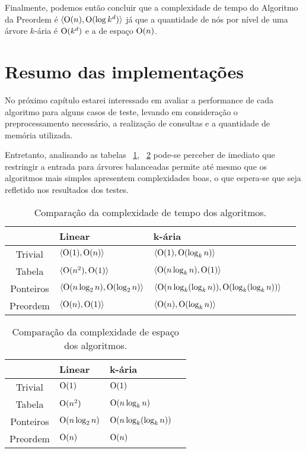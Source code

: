 Finalmente, podemos então concluir que a complexidade de tempo do Algoritmo da Preordem é
$\langle \mathrm{O}(n), \mathrm{O}(\log k^d)\rangle$ já que a quantidade de nós por nível de uma
árvore $k$-ária é $\mathrm{O}(k^d)$ e a de espaço $\mathrm{O}(n)$.

\section{Resumo das implementações}
No próximo capítulo estarei interessado em avaliar a performance de cada algoritmo
para alguns casos de teste, levando em consideração o preprocessamento necessário,
a realização de consultas e a quantidade de memória utilizada.

Entretanto, analisando as tabelas ~\ref{tab:complexidadetempo},
~\ref{tab:complexidadeespaco} pode-se perceber de imediato que restringir a entrada
para árvores balanceadas permite até mesmo que os algoritmos mais simples apresentem
complexidades boas, o que espera-se que seja refletido nos resultados dos testes.

\begin{table}[]
  \begin{tabular}{|c|l|l|l|}
    \hline
    & Linear                                       & k-ária                                       \\ \hline
  Trivial   & $\langle \mathrm{O}(1), \mathrm{O}(n) \rangle$                 & $\langle \mathrm{O}(1), \mathrm{O}(\log_k n) \rangle$          \\ \hline
  Tabela    & $\langle \mathrm{O}(n^2), \mathrm{O}(1) \rangle$               & $\langle \mathrm{O}(n \log_k n), \mathrm{O}(1) \rangle$        \\ \hline
  Ponteiros & $\langle \mathrm{O}(n \log_2 n), \mathrm{O}(\log_2 n) \rangle$ & $\langle \mathrm{O}(n \log_k (\log_k n)), \mathrm{O}(\log_k (\log_k n)) \rangle$ \\ \hline
  Preordem  & $\langle \mathrm{O}(n), \mathrm{O}(1) \rangle$                 & $\langle \mathrm{O}(n), \mathrm{O}(\log_k n) \rangle$          \\ \hline
  \end{tabular}
  \caption{Comparação da complexidade de tempo dos algoritmos.\label{tab:complexidadetempo}}
  \end{table}

  \begin{table}[]
    \begin{tabular}{|c|l|l|l|}
    \hline
              & Linear              & k-ária              \\ \hline
    Trivial   & $\mathrm{O}(1)$          & $\mathrm{O}(1)$              \\ \hline
    Tabela    & $\mathrm{O}(n^2)$        & $\mathrm{O}(n \log_k n)$ \\ \hline
    Ponteiros & $\mathrm{O}(n \log_2 n)$ & $\mathrm{O}(n \log_k (\log_k n))$ \\ \hline
    Preordem  & $\mathrm{O}(n)$          & $\mathrm{O}(n)$          \\ \hline
    \end{tabular}
    \caption{Comparação da complexidade de espaço dos algoritmos.\label{tab:complexidadeespaco}}
    \end{table}
